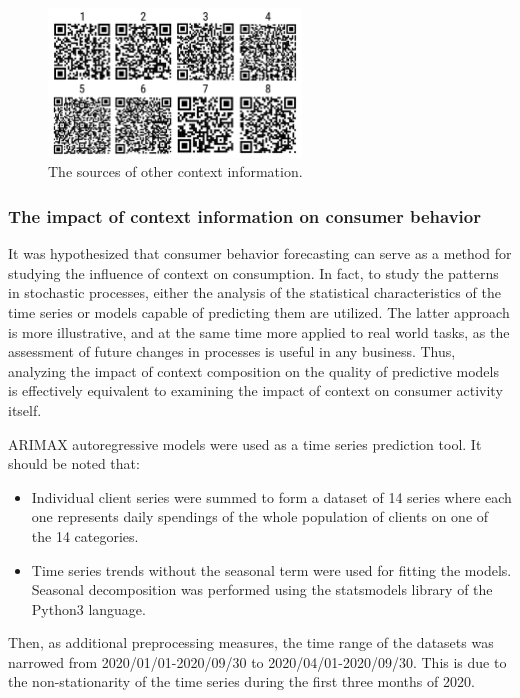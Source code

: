 \documentclass[13pt, a4paper]{article}
\begin{document}
\begin{figure}[h!]\vspace*{4pt}
	\centerline{\includegraphics[width=0.6\textwidth]{./visuals/gr9.png}}
\caption{The sources of other context information.}
\label{fig:gr9}
\end{figure}

\subsubsection{The impact of context information on consumer behavior}

It was hypothesized that consumer behavior forecasting can serve as a method for studying the influence of context on consumption. In fact, to study the patterns in stochastic processes, either the analysis of the statistical characteristics of the time series or models capable of predicting them are utilized. The latter approach is more illustrative, and at the same time more applied to real world tasks, as the assessment of future changes in processes is useful in any business. Thus, analyzing the impact of context composition on the quality of predictive models is effectively equivalent to examining the impact of context on consumer activity itself. 

ARIMAX autoregressive models were used as a time series prediction tool. It should be noted that:
\begin{itemize}
	\item Individual client series were summed to form a dataset of 14 series where each one represents daily spendings of the whole population of clients on one of the 14 categories.
	\item Time series trends without the seasonal term were used for fitting the models. Seasonal decomposition was performed using the statsmodels library of the Python3 language.
\end{itemize}
Then, as additional preprocessing measures, the time range of the datasets was narrowed from 2020/01/01-2020/09/30 to 2020/04/01-2020/09/30. This is due to the non-stationarity of the time series during the first three months of 2020.
\end{document}
